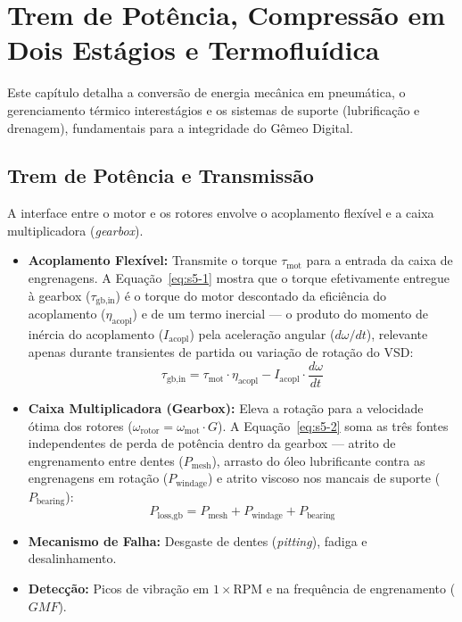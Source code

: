 \documentclass[12pt,a4paper]{article}
\numberwithin{equation}{section}
\numberwithin{table}{section}
\numberwithin{figure}{section}
\begin{document}
	
	
	\section{\textbf{Trem de Potência, Compressão em Dois Estágios e Termofluídica}}
	
	Este capítulo detalha a conversão de energia mecânica em pneumática, o gerenciamento térmico interestágios e os sistemas de suporte (lubrificação e drenagem), fundamentais para a integridade do Gêmeo Digital.
	
	\subsection{\textbf{Trem de Potência e Transmissão}}
	A interface entre o motor e os rotores envolve o acoplamento flexível e a caixa multiplicadora (\textit{gearbox}).
	\begin{itemize}
		\item \textbf{Acoplamento Flexível:} Transmite o torque $\tau_{\text{mot}}$ para a entrada da caixa de engrenagens. A Equação~\eqref{eq:s5-1} mostra que o torque efetivamente entregue à gearbox ($\tau_{\text{gb,in}}$) é o torque do motor descontado da eficiência do acoplamento ($\eta_{\text{acopl}}$) e de um termo inercial — o produto do momento de inércia do acoplamento ($I_{\text{acopl}}$) pela aceleração angular ($d\omega/dt$), relevante apenas durante transientes de partida ou variação de rotação do VSD:
		\begin{equation}\label{eq:s5-1}
 \tau_{\text{gb,in}} = \tau_{\text{mot}} \cdot \eta_{\text{acopl}} - I_{\text{acopl}} \cdot \frac{d\omega}{dt}
\end{equation}
		\item \textbf{Caixa Multiplicadora (Gearbox):} Eleva a rotação para a velocidade ótima dos rotores ($\omega_{\text{rotor}} = \omega_{\text{mot}} \cdot G$). A Equação~\eqref{eq:s5-2} soma as três fontes independentes de perda de potência dentro da gearbox — atrito de engrenamento entre dentes ($P_{\text{mesh}}$), arrasto do óleo lubrificante contra as engrenagens em rotação ($P_{\text{windage}}$) e atrito viscoso nos mancais de suporte ($P_{\text{bearing}}$):
		\begin{equation}\label{eq:s5-2}
 P_{\text{loss,gb}} = P_{\text{mesh}} + P_{\text{windage}} + P_{\text{bearing}}
\end{equation}
		\item \textbf{Mecanismo de Falha:} Desgaste de dentes (\textit{pitting}), fadiga e desalinhamento.
		\item \textbf{Detecção:} Picos de vibração em $1 \times \text{RPM}$ e na frequência de engrenamento ($GMF$).
	\end{itemize}
	
\end{document}
